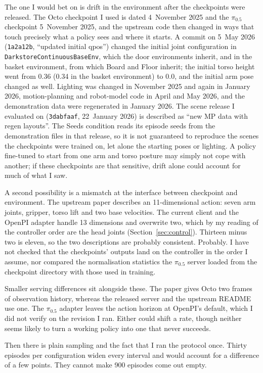 The one I would bet on is drift in the environment after the checkpoints were released. The Octo checkpoint I used is dated 4~November 2025 and the $\pi_{0.5}$ checkpoint 5~November 2025, and the upstream code then changed in ways that touch precisely what a policy sees and where it starts. A commit on 5~May 2026 (\texttt{1a2a12b}, ``updated initial qpos'') changed the initial joint configuration in \texttt{DarkstoreContinuousBaseEnv}, which the door environments inherit, and in the basket environment, from which Board and Floor inherit; the initial torso height went from 0.36 (0.34 in the basket environment) to 0.0, and the initial arm pose changed as well. Lighting was changed in November 2025 and again in January 2026, motion-planning and robot-model code in April and May 2026, and the demonstration data were regenerated in January 2026. The scene release I evaluated on (\texttt{3dabfaaf}, 22~January 2026) is described as ``new MP data with regen layouts''. The Seeds condition reads its episode seeds from the demonstration files in that release, so it is not guaranteed to reproduce the scenes the checkpoints were trained on, let alone the starting poses or lighting. A policy fine-tuned to start from one arm and torso posture may simply not cope with another; if these checkpoints are that sensitive, drift alone could account for much of what I saw.

A second possibility is a mismatch at the interface between checkpoint and environment. The upstream paper describes an 11-dimensional action: seven arm joints, gripper, torso lift and two base velocities. The current client and the OpenPI adapter handle 13 dimensions and overwrite two, which by my reading of the controller order are the head joints (Section~\ref{sec:control}). Thirteen minus two is eleven, so the two descriptions are probably consistent. Probably. I have not checked that the checkpoints' outputs land on the controller in the order I assume, nor compared the normalisation statistics the $\pi_{0.5}$ server loaded from the checkpoint directory with those used in training.

Smaller serving differences sit alongside these. The paper gives Octo two frames of observation history, whereas the released server and the upstream README use one. The $\pi_{0.5}$ adapter leaves the action horizon at OpenPI's default, which I did not verify on the revision I ran. Either could shift a rate, though neither seems likely to turn a working policy into one that never succeeds.

Then there is plain sampling and the fact that I ran the protocol once. Thirty episodes per configuration widen every interval and would account for a difference of a few points. They cannot make 900 episodes come out empty.


